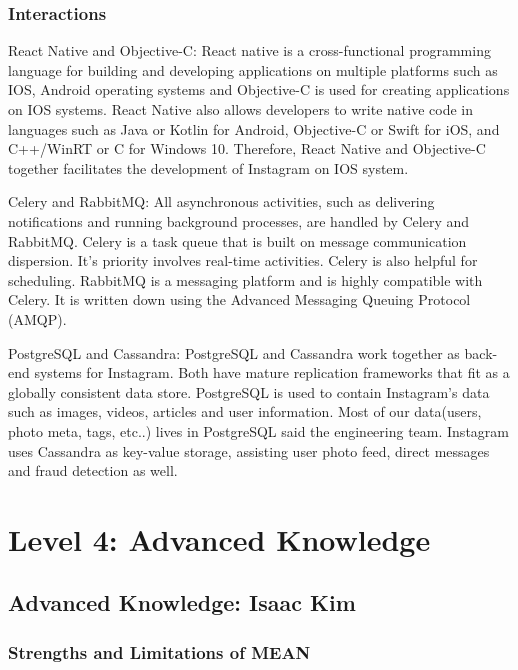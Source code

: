 \documentclass[a4paper, 11pt]{report}
\begin{document}
\subsubsection{ Interactions}
React Native and Objective-C: React native is a cross-functional programming language for building and developing applications on multiple platforms such as IOS, Android operating 
systems and Objective-C is used for creating applications on IOS systems. React Native also allows developers to write native code in languages such as Java or Kotlin for Android, Objective-C or Swift for iOS, and C++/WinRT or C for Windows 10. Therefore, React Native and Objective-C together facilitates the development of Instagram on IOS system.

 Celery and RabbitMQ: All asynchronous activities, such as delivering notifications and running background processes, are handled by Celery and RabbitMQ. Celery is a task queue that is built on message communication dispersion. It's priority involves real-time activities. Celery is also helpful for scheduling. RabbitMQ is a messaging platform and is highly compatible with Celery. It is written down using the Advanced Messaging Queuing Protocol (AMQP).

PostgreSQL and Cassandra: PostgreSQL and Cassandra work together as back-end systems for Instagram. Both have mature replication frameworks that fit as a globally consistent data store. PostgreSQL is used to contain Instagram's data such as images, videos, articles and user information. Most of our data(users, photo meta, tags, etc..) lives in PostgreSQL said the engineering team. Instagram uses Cassandra as key-value storage, assisting user photo feed, direct messages and fraud detection as well.


\newpage
\section{Level 4: Advanced Knowledge}

\subsection{Advanced Knowledge: Isaac Kim}

\subsubsection{Strengths and Limitations of MEAN}
\end{document}

